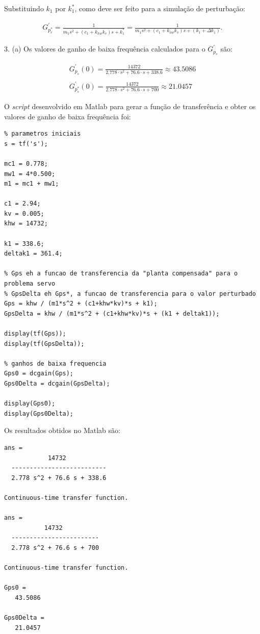 \documentclass[a4paper,11pt]{article}
\begin{document}
Substituindo $k_1$ por $k_1^\ast$, como deve ser feito para a simulação de
perturbação:

\begin{gather*}
    G^\prime_{p_r^\ast} =
        \frac{1}{m_1s^2 + \left( c_1 + k_{hw} k_v \right) s + k_1^\ast} =
        \frac{1}{m_1s^2 + \left( c_1 + k_{hw} k_v \right) s +
        \left( k_1 + \Delta k_1 \right)}.
\end{gather*}

3. (a) Os valores de ganho de baixa frequência calculados para o
$G^\prime_{p_s}$ são:

\begin{gather*}
    G^\prime_{p_s} \left( 0 \right) = \frac{14372}{2.778 \cdot s^2 + 76.6 \cdot
        s + 338.6} \approx 43.5086 \\ \\
    G^\prime_{p_s^\ast} \left( 0 \right) = \frac{14372}{2.778 \cdot s^2 + 76.6
        \cdot s + 700} \approx 21.0457
\end{gather*}

\pagebreak

O \textit{script} desenvolvido em Matlab para gerar a função de transferência e
obter os valores de ganho de baixa frequência foi:

\begin{lstlisting}
% parametros iniciais
s = tf('s');

mc1 = 0.778;
mw1 = 4*0.500;
m1 = mc1 + mw1;

c1 = 2.94;
kv = 0.005;
khw = 14732;

k1 = 338.6;
deltak1 = 361.4;

% Gps eh a funcao de transferencia da "planta compensada" para o problema servo
% GpsDelta eh Gps*, a funcao de transferencia para o valor perturbado
Gps = khw / (m1*s^2 + (c1+khw*kv)*s + k1);
GpsDelta = khw / (m1*s^2 + (c1+khw*kv)*s + (k1 + deltak1));

display(tf(Gps));
display(tf(GpsDelta));

% ganhos de baixa frequencia
Gps0 = dcgain(Gps);
Gps0Delta = dcgain(GpsDelta);

display(Gps0);
display(Gps0Delta);
\end{lstlisting}

Os resultados obtidos no Matlab são:

\begin{lstlisting}
ans =
            14732
  --------------------------
  2.778 s^2 + 76.6 s + 338.6
 
Continuous-time transfer function.

ans =
           14732
  ------------------------
  2.778 s^2 + 76.6 s + 700
 
Continuous-time transfer function.

Gps0 =
   43.5086

Gps0Delta =
   21.0457
\end{lstlisting}
\end{document}
